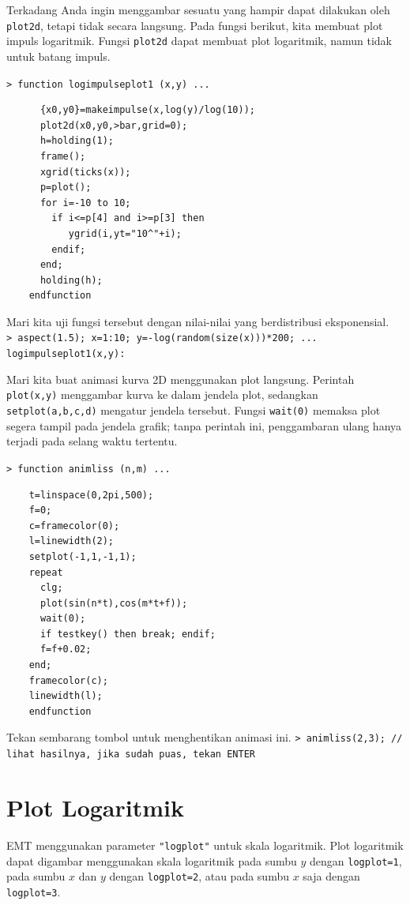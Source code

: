 \documentclass[11pt, a4paper]{article}
\newcommand{\emtcmd}[1]{\noindent\texttt{\textcolor{emtcommand}{>}\ #1}\par\smallskip}
\begin{document}
Terkadang Anda ingin menggambar sesuatu yang hampir dapat dilakukan oleh \texttt{plot2d}, tetapi tidak secara langsung. Pada fungsi berikut, kita membuat plot impuls logaritmik. Fungsi \texttt{plot2d} dapat membuat plot logaritmik, namun tidak untuk batang impuls.

\emtcmd{function logimpulseplot1 (x,y) ...}
\begin{verbatim}
      {x0,y0}=makeimpulse(x,log(y)/log(10));
      plot2d(x0,y0,>bar,grid=0);
      h=holding(1);
      frame();
      xgrid(ticks(x));
      p=plot();
      for i=-10 to 10;
        if i<=p[4] and i>=p[3] then
           ygrid(i,yt="10^"+i);
        endif;
      end;
      holding(h);
    endfunction
\end{verbatim}

Mari kita uji fungsi tersebut dengan nilai-nilai yang berdistribusi eksponensial.
\emtcmd{aspect(1.5); x=1:10; y=-log(random(size(x)))*200; ... \\
\hspace*{1em} logimpulseplot1(x,y):}

Mari kita buat animasi kurva 2D menggunakan plot langsung. Perintah \texttt{plot(x,y)} menggambar kurva ke dalam jendela plot, sedangkan \texttt{setplot(a,b,c,d)} mengatur jendela tersebut. Fungsi \texttt{wait(0)} memaksa plot segera tampil pada jendela grafik; tanpa perintah ini, penggambaran ulang hanya terjadi pada selang waktu tertentu.

\emtcmd{function animliss (n,m) ...}
\begin{verbatim}
    t=linspace(0,2pi,500);
    f=0;
    c=framecolor(0);
    l=linewidth(2);
    setplot(-1,1,-1,1);
    repeat
      clg;
      plot(sin(n*t),cos(m*t+f));
      wait(0);
      if testkey() then break; endif;
      f=f+0.02;
    end;
    framecolor(c);
    linewidth(l);
    endfunction
\end{verbatim}

Tekan sembarang tombol untuk menghentikan animasi ini.
\emtcmd{animliss(2,3); \textcolor{emtcomment}{// lihat hasilnya, jika sudah puas, tekan ENTER}}

\section*{Plot Logaritmik}

EMT menggunakan parameter \texttt{"logplot"} untuk skala logaritmik. Plot logaritmik dapat digambar menggunakan skala logaritmik pada sumbu $y$ dengan \texttt{logplot=1}, pada sumbu $x$ dan $y$ dengan \texttt{logplot=2}, atau pada sumbu $x$ saja dengan \texttt{logplot=3}.
\end{document}
